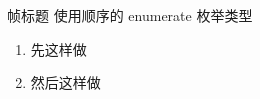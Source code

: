 \begin{frame}{帧标题}
  使用顺序的 enumerate 枚举类型

  \begin{enumerate}
  \item 先这样做
  \item 然后这样做
  \end{enumerate}
\end{frame}

